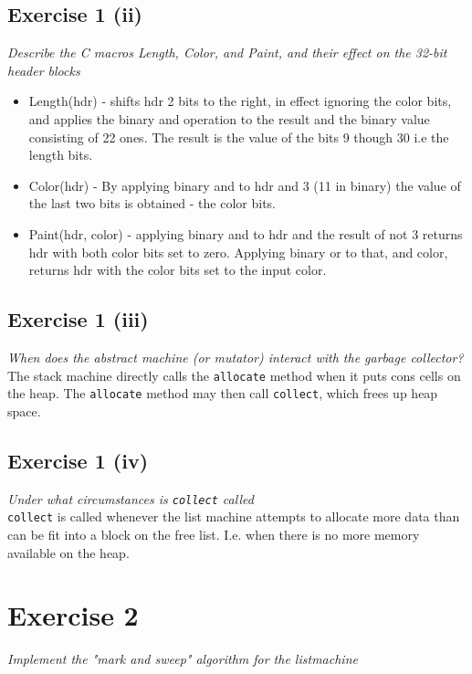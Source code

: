 \documentclass[a4paper, titlepage]{article}
\begin{document}
\subsection{Exercise 1 (ii)}
\textit{Describe the C macros Length, Color, and Paint, and their effect on the
32-bit header blocks}\\

\begin{itemize}
	\item Length(hdr) - shifts hdr 2 bits to the right, in effect
		ignoring the color bits, and applies the binary and operation to
		the result and the binary value consisting of 22 ones. The
		result is the value of the bits 9 though 30 i.e the length bits.
	\item Color(hdr) - By applying binary and to hdr and 3 (11 in binary)
		the value of the last two bits is obtained - the color bits.
	\item Paint(hdr, color) - applying binary and to hdr and the result of
		not 3 returns hdr with both color bits set to zero. Applying
		binary or to that, and color, returns hdr with the color bits
		set to the input color.
\end{itemize}
\subsection{Exercise 1 (iii)}
\textit{When does the abstract machine (or mutator) interact with the garbage
collector?}\\

The stack machine directly calls the \texttt{allocate} method when it puts cons
cells on the heap. The \texttt{allocate} method may then call \texttt{collect},
which frees up heap space.

\subsection{Exercise 1 (iv)}
\textit{Under what circumstances is \emph{\texttt{collect}} called}\\

\texttt{collect} is called whenever the list machine attempts to allocate more
data than can be fit into a block on the free list. I.e. when there is no more
memory available on the heap.

\section{Exercise 2}
\textit{Implement the "mark and sweep" algorithm for the listmachine}\\
\end{document}
